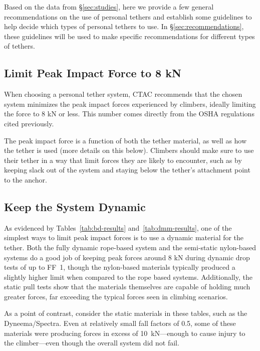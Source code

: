 \documentclass[nonacm,acmtog]{acmart}
\begin{document}
   Based on the data from \S\ref{sec:studies}, here we provide a few general
   recommendations on the use of personal tethers and establish some guidelines
   to help decide which types of personal tethers to use.  In
   \S\ref{sec:recommendations}, these guidelines will be used to make specific
   recommendations for different types of tethers.

\subsection{Limit Peak Impact Force to 8 kN}

   When choosing a personal tether system, CTAC recommends that the chosen
   system minimizes the peak impact forces experienced by climbers, ideally
   limiting the force to 8 kN or less.  This number comes directly from the
   OSHA regulations cited previously.

   The peak impact force is a function of both the tether material, as well as
   how the tether is used (more details on this below).  Climbers should make
   sure to use their tether in a way that limit forces they are likely to
   encounter, such as by keeping slack out of the system and staying below the
   tether's attachment point to the anchor.

\subsection{Keep the System Dynamic}
\label{sec:forces}

   As evidenced by Tables~\ref{tab:bd-results} and~\ref{tab:dmm-results}, one of
   the simplest ways to limit peak impact forces is to use a dynamic material
   for the tether.  Both the fully dynamic rope-based system and the semi-static
   nylon-based systems do a good job of keeping peak forces around 8 kN during
   dynamic drop tests of up to FF~1, though the nylon-based materials typically
   produced a slightly higher limit when compared to the rope based systems.
   Additionally, the static pull tests show that the materials themselves are
   capable of holding much greater forces, far exceeding the typical forces seen
   in climbing scenarios.

   As a point of contrast, consider the static materials in these tables, such
   as the Dyneema/Spectra.  Even at relatively small fall factors of 0.5, some
   of these materials were producing forces in excess of 10~kN---enough to
   cause injury to the climber---even though the overall system did not fail.
\end{document}
